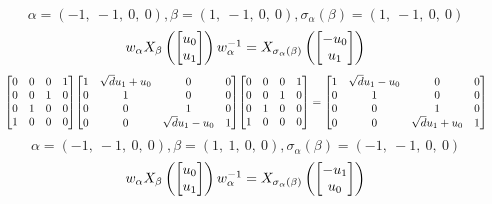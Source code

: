 \documentclass[11pt]{article}
\theoremstyle{definition}
\begin{document}
\[
\alpha = \left( -1, \  -1, \  0, \  0\right), \beta = \left( 1, \  -1, \  0, \  0\right), \sigma_{\alpha}(\beta) = \left( 1, \  -1, \  0, \  0\right)
\]
\[
\scaletoalign{\textwidth}{w_{\alpha} X_{\beta}\left(\left[\begin{matrix}u_{0}\\u_{1}\end{matrix}\right]\right) w_{\alpha}^{-1} = X_{\sigma_{\alpha}\left(\beta\right)}\left(\left[\begin{matrix}- u_{0}\\u_{1}\end{matrix}\right]\right)}
\]
\[
\scaletoalign{\textwidth}{{\left[\begin{matrix}0 & 0 & 0 & 1\\0 & 0 & 1 & 0\\0 & 1 & 0 & 0\\1 & 0 & 0 & 0\end{matrix}\right]} {\left[\begin{matrix}1 & \sqrt{d} u_{1} + u_{0} & 0 & 0\\0 & 1 & 0 & 0\\0 & 0 & 1 & 0\\0 & 0 & \sqrt{d} u_{1} - u_{0} & 1\end{matrix}\right]} {\left[\begin{matrix}0 & 0 & 0 & 1\\0 & 0 & 1 & 0\\0 & 1 & 0 & 0\\1 & 0 & 0 & 0\end{matrix}\right]} = {\left[\begin{matrix}1 & \sqrt{d} u_{1} - u_{0} & 0 & 0\\0 & 1 & 0 & 0\\0 & 0 & 1 & 0\\0 & 0 & \sqrt{d} u_{1} + u_{0} & 1\end{matrix}\right]}}
\]
\[
\alpha = \left( -1, \  -1, \  0, \  0\right), \beta = \left( 1, \  1, \  0, \  0\right), \sigma_{\alpha}(\beta) = \left( -1, \  -1, \  0, \  0\right)
\]
\[
\scaletoalign{\textwidth}{w_{\alpha} X_{\beta}\left(\left[\begin{matrix}u_{0}\\u_{1}\end{matrix}\right]\right) w_{\alpha}^{-1} = X_{\sigma_{\alpha}\left(\beta\right)}\left(\left[\begin{matrix}- u_{1}\\u_{0}\end{matrix}\right]\right)}
\]
\end{document}
